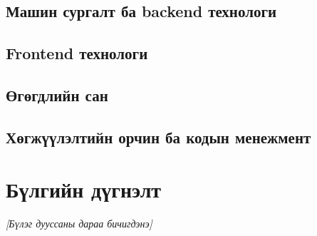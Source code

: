 \subsection{Машин сургалт ба backend технологи}
\ph
\subsection{Frontend технологи}
\ph
\subsection{Өгөгдлийн сан}
\ph
\subsection{Хөгжүүлэлтийн орчин ба кодын менежмент}
\ph

\section*{Бүлгийн дүгнэлт}
\textit{[Бүлэг дууссаны дараа бичигдэнэ]}
